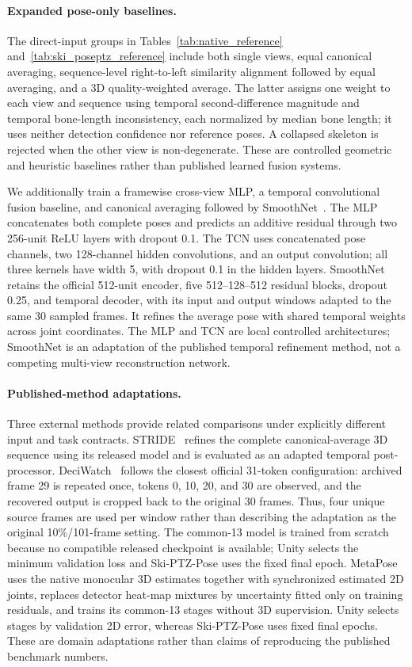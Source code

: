 \paragraph{Expanded pose-only baselines.}
The direct-input groups in Tables~\ref{tab:native_reference} and~\ref{tab:ski_poseptz_reference} include both single views, equal canonical averaging, sequence-level right-to-left similarity alignment followed by equal averaging, and a 3D quality-weighted average. The latter assigns one weight to each view and sequence using temporal second-difference magnitude and temporal bone-length inconsistency, each normalized by median bone length; it uses neither detection confidence nor reference poses. A collapsed skeleton is rejected when the other view is non-degenerate. These are controlled geometric and heuristic baselines rather than published learned fusion systems.

We additionally train a framewise cross-view MLP, a temporal convolutional fusion baseline, and canonical averaging followed by SmoothNet~\cite{zeng2022smoothnet}. The MLP concatenates both complete poses and predicts an additive residual through two 256-unit ReLU layers with dropout 0.1. The TCN uses concatenated pose channels, two 128-channel hidden convolutions, and an output convolution; all three kernels have width 5, with dropout 0.1 in the hidden layers. SmoothNet retains the official 512-unit encoder, five 512--128--512 residual blocks, dropout 0.25, and temporal decoder, with its input and output windows adapted to the same 30 sampled frames. It refines the average pose with shared temporal weights across joint coordinates. The MLP and TCN are local controlled architectures; SmoothNet is an adaptation of the published temporal refinement method, not a competing multi-view reconstruction network.

\paragraph{Published-method adaptations.}
Three external methods provide related comparisons under explicitly different input and task contracts. STRIDE~\cite{lal2025stride} refines the complete canonical-average 3D sequence using its released model and is evaluated as an adapted temporal post-processor. DeciWatch~\cite{zeng2022deciwatch} follows the closest official 31-token configuration: archived frame 29 is repeated once, tokens 0, 10, 20, and 30 are observed, and the recovered output is cropped back to the original 30 frames. Thus, four unique source frames are used per window rather than describing the adaptation as the original 10\%/101-frame setting. The common-13 model is trained from scratch because no compatible released checkpoint is available; Unity selects the minimum validation loss and Ski-PTZ-Pose uses the fixed final epoch. MetaPose~\cite{usman2022metapose} uses the native monocular 3D estimates together with synchronized estimated 2D joints, replaces detector heat-map mixtures by uncertainty fitted only on training residuals, and trains its common-13 stages without 3D supervision. Unity selects stages by validation 2D error, whereas Ski-PTZ-Pose uses fixed final epochs. These are domain adaptations rather than claims of reproducing the published benchmark numbers.

